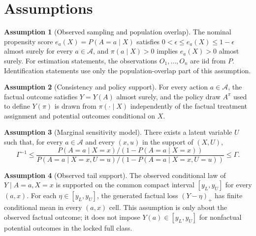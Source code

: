 \documentclass[11pt]{article}
\theoremstyle{definition}
\newtheorem{assumption}{Assumption}
\theoremstyle{plain}
\theoremstyle{remark}
\begin{document}
\section{Assumptions}
\begin{assumption}[Observed sampling and population overlap]\label{ass:iid-overlap}
The nominal propensity score
\(e_a(X)=P(A=a\mid X)\) satisfies
\(0<\epsilon\leq e_a(X)\leq 1-\epsilon\) almost surely for every
\(a\in\mathcal A\), and \(\pi(a\mid X)>0\) implies \(e_a(X)>0\) almost surely.
For estimation statements, the observations \(O_1,\ldots,O_n\) are iid from
\(P\).  Identification statements use only the population-overlap part of this
assumption.
\end{assumption}

\begin{assumption}[Consistency and policy support]\label{ass:consistency}
For every action \(a\in\mathcal A\), the factual outcome satisfies \(Y=Y(A)\)
almost surely, and the policy draw \(A^\pi\) used to define \(Y(\pi)\) is drawn
from \(\pi(\cdot\mid X)\) independently of the factual treatment assignment and
potential outcomes conditional on \(X\).
\end{assumption}

\begin{assumption}[Marginal sensitivity model]\label{ass:msm}
There exists a latent variable \(U\) such that, for every \(a\in\mathcal A\) and
every \((x,u)\) in the support of \((X,U)\),
\[
\Gamma^{-1}\leq
\frac{P(A=a\mid X=x)/(1-P(A=a\mid X=x))}
{P(A=a\mid X=x,U=u)/(1-P(A=a\mid X=x,U=u))}
\leq \Gamma.
\]
\end{assumption}

\begin{assumption}[Observed tail support]\label{ass:tail}
The observed conditional law of \(Y\mid A=a,X=x\) is supported on the common
compact interval \([y_L,y_U]\) for every \((a,x)\).  For each
\(\eta\in[y_L,y_U]\), the generated factual loss \((Y-\eta)_+\) has finite
conditional mean in every \((a,x)\) cell.  This assumption is only about the
observed factual outcome; it does not impose \(Y(a)\in[y_L,y_U]\) for
nonfactual potential outcomes in the locked full class.
\end{assumption}
\end{document}
